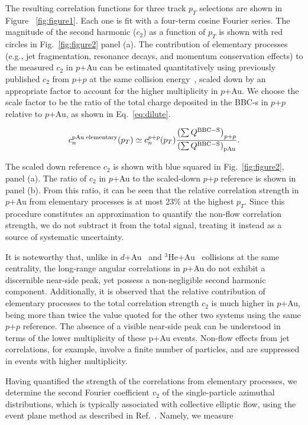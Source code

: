 \documentclass[%
reprint,
showpacs,preprintnumbers,
 amsmath,amssymb,
 aps,
]{revtex4-1}
\newcommand{\pt}{\mbox{$p_T$}\xspace}
\newcommand{\dau}{\mbox{$d$+Au}\xspace}
\newcommand{\pau}{\mbox{$p$+Au}\xspace}
\newcommand{\hau}{\mbox{$^3\text{He}$+Au}\xspace}
\newcommand{\pp}{\mbox{$p$+$p$}\xspace}
\begin{document}
The resulting correlation functions for three track \pt selections are shown in Figure ~\ref{fig:figure1}. Each one is fit with a four-term cosine Fourier series. The magnitude of the second harmonic ($c_{2}$) as a function of \pt is shown with red circles in Fig.~\ref{fig:figure2} panel (a). The contribution of elementary processes (e.g., jet fragmentation, resonance decays, and momentum conservation effects) to the measured $c_2$ in \pau can be estimated quantitatively using previously published $c_2$ from \pp at the same collision energy~\cite{Adare:2015ctn}, scaled down by an appropriate factor to account for the higher multiplicity in \pau. We choose the scale factor to be the ratio of the total charge deposited in the BBC-s in \pp relative to \pau, as shown in Eq.~\ref{eq:dilute}. 

\begin{equation}
c_{n}^{{\rm pAu \; elementary}}(p_{T}) \simeq c_{n}^{p+p}(p_{T})
\frac{\left( \sum Q^{{\rm BBC-S}} \right)_{p+p}}
{\left( \sum Q^{{\rm BBC-S}} \right)_{{\rm pAu}}
}.
\label{eq:dilute}
\end{equation}

The scaled down reference $c_{2}$ is shown with blue squared in Fig.~\ref{fig:figure2}, panel (a). The ratio of $c_2$ in \pau to the scaled-down \pp reference is shown in panel (b). From this ratio, it can be seen that the relative correlation strength in \pau from elementary processes is at most 23\% at the highest \pt. Since this procedure constitutes an approximation to quantify the non-flow correlation strength, we do not subtract it from the total signal, treating it instead as a source of systematic uncertainty.

It is noteworthy that, unlike in \dau~\cite{adare_measurement_2014} and \hau~\cite{PhysRevLett.115.142301} collisions at the same centrality, the long-range angular correlations in \pau do not exhibit a discernible near-side peak, yet possess a non-negligible second harmonic component. Additionally, it is observed that the relative contribution of elementary processes to the total correlation strength $c_2$ is much higher in \pau, being more than twice the value quoted for the other two systems using the same \pp reference. The absence of a visible near-side peak can be understood in terms of the lower multiplicity of these p+Au events. Non-flow effects from jet correlations, for example, involve a finite number of particles, and are suppressed in events with higher multiplicity.

Having quantified the strength of the correlations from elementary processes, we determine the second Fourier coefficient $v_2$ of the single-particle azimuthal distributions, which is typically associated with collective elliptic flow, using the event plane method as described in Ref.~\cite{Poskanzer:1998yz}. Namely, we measure 
\end{document}
